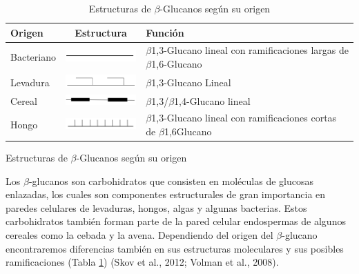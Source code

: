\documentclass[12pt,a4paper,]{article}
\begin{document}
\begin{table}[h!]
\sffamily
\begin{center}
\begin{threeparttable}
\caption{Estructuras de $\beta$-Glucanos según su origen}\label{tablaglucanos}
\begin{tabularx}{13cm}{l c X}
\toprule
Origen & Estructura & Función \\
\midrule
Bacteriano & \includegraphics[width=3cm]{bgbacteriano} & $\beta$1,3-Glucano lineal con ramificaciones largas de $\beta$1,6-Glucano\\
Levadura & \includegraphics[width=3cm]{bglevadura} & $\beta$1,3-Glucano Lineal \\ 
Cereal & \includegraphics[width=3cm]{bgcereal} & $\beta$1,3/$\beta$1,4-Glucano lineal \\
Hongo & \includegraphics[width=3cm]{bghongo} & $\beta$1,3-Glucano lineal con ramificaciones cortas de $\beta$1,6Glucano \\

\bottomrule
\end{tabularx}
\begin{tablenotes}
    \item Estructuras de $\beta$-Glucanos según su origen
\end{tablenotes}
\end{threeparttable}
\end{center}
\end{table}

Los $\beta$-glucanos son carbohidratos que consisten en moléculas de
glucosas enlazadas, los cuales son componentes estructurales de gran
importancia en paredes celulares de levaduras, hongos, algas y algunas
bacterias. Estos carbohidratos también forman parte de la pared celular
endospermas de algunos cereales como la cebada y la avena. Dependiendo
del origen del $\beta$-glucano encontraremos diferencias también en sus
estructuras moleculares y sus posibles ramificaciones (Tabla
\ref{tablaglucanos}) (Skov et al., 2012; Volman et al., 2008).
\end{document}

